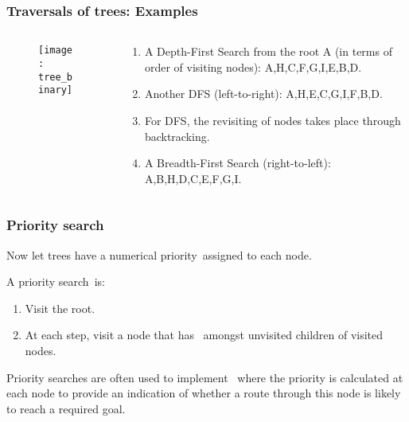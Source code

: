   \begin{frame}[fragile]
\frametitle{Traversals of trees: Examples}

  \begin{columns}
    \begin{column}{0.5\textwidth}

    \begin{figure} [ht]
    \centering
    \texttt{[image: tree\_binary]}
    \end{figure}
    \end{column}
    
        \begin{column}{0.5\textwidth}

\begin{enumerate}
\item A Depth-First Search from the root \color{blue}A \color{black} (in terms of order of visiting nodes): \color{blue}A,H,C,F,G,I,E,B,D.\color{black}
\item Another DFS (left-to-right): \color{blue}A,H,E,C,G,I,F,B,D.\color{black}
\item For DFS, the revisiting of nodes takes place through \color{red}backtracking\color{black}.
\item A Breadth-First Search (right-to-left): \color{blue}A,B,H,D,C,E,F,G,I.\color{black}
\end{enumerate}
    \end{column}
      \end{columns}
\end{frame}

  \begin{frame}[fragile]
\frametitle{Priority search}

Now let trees have a \color{blue}numerical priority\color{black}\ assigned to each node.

A \color{red}priority search\color{black}\ is:

\begin{enumerate}
\item Visit the root.
\item At each step, visit a node that has \color{blue}{highest priority}\ amongst unvisited children of visited nodes.
\end{enumerate}

Priority searches are often used to implement \color{blue}{heuristic search methods}\ where the priority is calculated at each node to provide an indication of whether a route through this node is likely to reach a required goal.

\end{frame}


